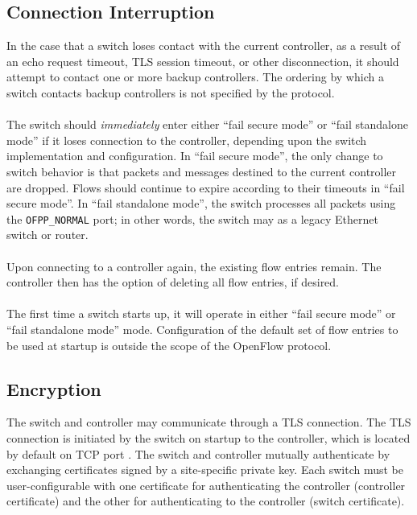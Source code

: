 \documentclass[10pt]{article}
\begin{document}
\subsection{Connection Interruption}
In the case that a switch loses contact with the current controller, as a result of an echo request timeout, TLS session timeout, or other disconnection, it should attempt to contact one or more backup controllers.  The ordering by which a switch contacts backup controllers is not specified by the protocol.
\\\\
The switch should \emph{immediately} enter either ``fail secure mode'' or ``fail standalone mode'' if it loses connection to the controller, depending upon the switch implementation and configuration. In ``fail secure mode'', the only change to switch behavior is that packets and messages destined to the current controller are dropped. Flows should continue to expire according to their timeouts in ``fail secure mode''. In ``fail standalone mode'', the switch processes all packets using the \verb|OFPP_NORMAL| port; in other words, the switch may as a legacy Ethernet switch or router.
\\\\
Upon connecting to a controller again, the existing flow entries remain.  The controller then has the option of deleting all flow entries, if desired.
\\\\
The first time a switch starts up, it will operate in either ``fail secure mode'' or ``fail standalone mode'' mode.  Configuration of the default set of flow entries to be used at startup is outside the scope of the OpenFlow protocol.

\subsection{Encryption}
The switch and controller may communicate through a TLS connection.  The TLS connection is initiated by the switch on startup to the controller, which is located by default on TCP port .   The switch and controller mutually authenticate by exchanging certificates signed by a site-specific private key.  Each switch must be user-configurable with one certificate for authenticating the controller (controller certificate) and the other for authenticating to the controller (switch certificate).
\end{document}
